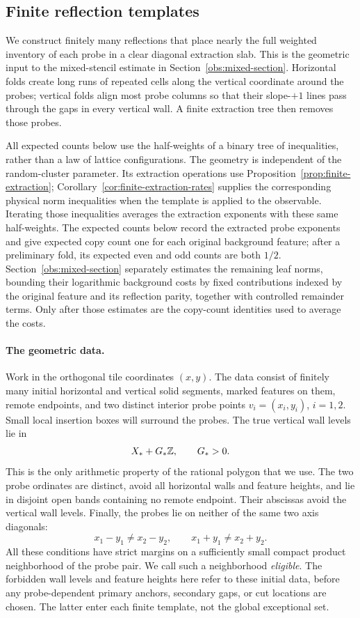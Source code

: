 \subsection{Finite reflection templates}
\label{calc:reflection-construction}

We construct finitely many reflections that place nearly the full
weighted inventory of each probe in a clear diagonal extraction slab.
This is the geometric input to the mixed-stencil estimate in
Section~\ref{obs:mixed-section}. Horizontal folds create long runs of
repeated cells along the vertical coordinate around the probes; vertical folds align most probe
columns so that their slope-$+1$ lines pass through the gaps in every
vertical wall. A finite extraction tree then removes those probes.

All expected counts below use the half-weights of a binary tree of
inequalities, rather than a law of lattice configurations. The geometry
is independent of the random-cluster parameter. Its extraction
operations use Proposition~\ref{prop:finite-extraction};
Corollary~\ref{cor:finite-extraction-rates} supplies the corresponding
physical norm inequalities when the template is applied to the
observable. Iterating those inequalities averages the extraction
exponents with these same half-weights. The expected counts below
record the extracted probe exponents and give expected copy count one
for each original background feature; after a preliminary fold, its
expected even and odd counts are both $1/2$.
Section~\ref{obs:mixed-section} separately estimates the remaining leaf
norms, bounding their logarithmic background costs by fixed contributions
indexed by the original feature and its reflection parity, together with
controlled remainder terms.
Only after those estimates are the copy-count identities used to average
the costs.

\paragraph{The geometric data.}
Work in the orthogonal tile coordinates $(x,y)$. The data consist of
finitely many initial horizontal and vertical solid segments, marked
features on them, remote endpoints, and two distinct interior probe points
$v_i=(x_i,y_i)$, $i=1,2$. Small local insertion boxes will surround the
probes. The true vertical wall levels lie in
\[
 X_*+G_*\mathbb Z,\qquad G_*>0.
\]
This is the only arithmetic property of the rational polygon that
we use. The two probe ordinates are distinct, avoid all horizontal
walls and feature heights, and lie in disjoint open bands containing
no remote endpoint. Their abscissas avoid the vertical wall levels.
Finally, the probes lie on neither of the same two axis diagonals:
\[
 x_1-y_1\ne x_2-y_2,
 \qquad x_1+y_1\ne x_2+y_2.
\]
All these conditions have strict margins on a sufficiently small
compact product neighborhood of the probe pair. We call such a
neighborhood \emph{eligible}.  The forbidden wall levels and feature
heights here refer to these initial data, before any probe-dependent
primary anchors, secondary gaps, or cut locations are chosen.  The
latter enter each finite template, not the global exceptional set.

